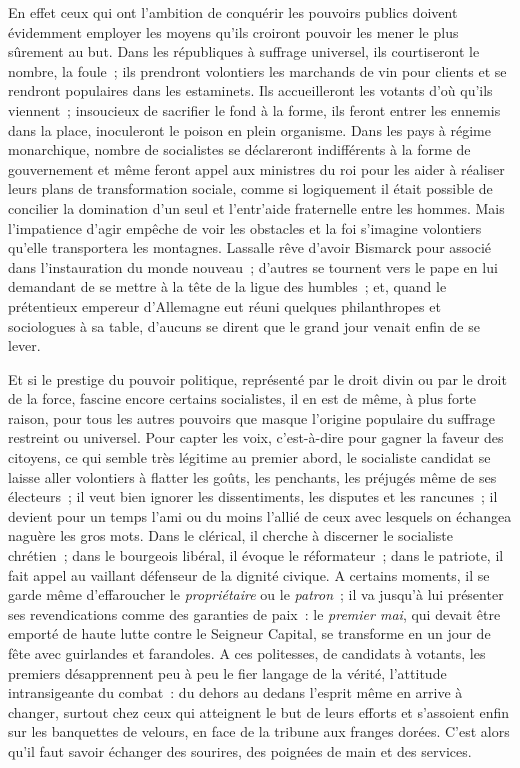 \documentclass[french,twoside]{book} %
\begin{document}
En effet ceux qui ont l’ambition de conquérir les pouvoirs publics doivent évidemment employer les moyens qu’ils croiront pouvoir les mener le plus sûrement  au but. Dans les républiques à suffrage universel, ils courtiseront le nombre, la foule ; ils prendront volontiers les marchands de vin pour clients et se rendront populaires dans les estaminets. Ils accueilleront les votants d’où qu’ils viennent ; insoucieux de sacrifier le fond à la forme, ils feront entrer les ennemis dans la place, inoculeront le poison en plein organisme. Dans les pays à régime monarchique, nombre de socialistes se déclareront indifférents à la forme de gouvernement et même feront appel aux ministres du roi pour les aider à réaliser leurs plans de transformation sociale, comme si logiquement il était possible de concilier la domination d’un seul et l’entr’aide fraternelle entre les hommes. Mais l’impatience  d’agir empêche de voir les obstacles et la foi s’imagine volontiers qu’elle transportera les montagnes. Lassalle rêve d’avoir Bismarck pour associé dans l’instauration du monde nouveau ; d’autres se tournent vers le pape en lui demandant de se mettre à la tête de la ligue des humbles ; et, quand le prétentieux empereur d’Allemagne eut réuni quelques philanthropes et sociologues à sa table, d’aucuns se dirent que le grand jour venait enfin de se lever.\par
Et si le prestige du pouvoir politique, représenté par le droit divin ou par le droit de la force, fascine encore certains socialistes, il en est de même, à plus forte raison, pour tous les autres pouvoirs que masque l’origine populaire du suffrage restreint ou universel.  Pour capter les voix, c’est-à-dire pour gagner la faveur des citoyens, ce qui semble très légitime au premier abord, le socialiste candidat se laisse aller volontiers à flatter les goûts, les penchants, les préjugés même de ses électeurs ; il veut bien ignorer les dissentiments, les disputes et les rancunes ; il devient pour un temps l’ami ou du moins l’allié de ceux avec lesquels on échangea naguère les gros mots. Dans le clérical, il cherche à discerner le socialiste chrétien ; dans le bourgeois libéral, il évoque le réformateur ; dans le patriote, il fait appel au vaillant défenseur de la dignité civique. A certains moments, il se garde même d’effaroucher le \emph{propriétaire} ou le \emph{patron} ; il va jusqu’à lui présenter  ses revendications comme des garanties de paix : le \emph{premier mai}, qui devait être emporté de haute lutte contre le Seigneur Capital, se transforme en un jour de fête avec guirlandes et farandoles. A ces politesses, de candidats à votants, les premiers désapprennent peu à peu le fier langage de la vérité, l’attitude intransigeante du combat : du dehors au dedans l’esprit même en arrive à changer, surtout chez ceux qui atteignent le but de leurs efforts et s’assoient enfin sur les banquettes de velours, en face de la tribune aux franges dorées. C’est alors qu’il faut savoir échanger des sourires, des poignées de main et des services.\par
\end{document}
